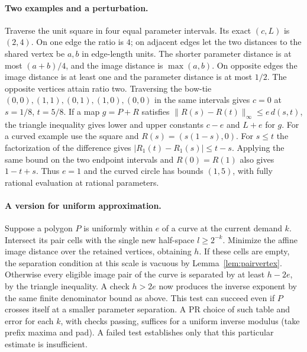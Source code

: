 \paragraph{Two examples and a perturbation.}
Traverse the unit square in four equal parameter intervals. Its exact $(c,L)$ is $(2,4)$. On one edge the ratio is $4$; on adjacent edges let the two distances to the shared vertex be $a,b$ in edge-length units. The shorter parameter distance is at most $(a+b)/4$, and the image distance is $\max(a,b)$. On opposite edges the image distance is at least one and the parameter distance is at most $1/2$. The opposite vertices attain ratio two. Traversing the bow-tie $(0,0),(1,1),(0,1),(1,0),(0,0)$ in the same intervals gives $c=0$ at $s=1/8$, $t=5/8$. If a map $g=P+R$ satisfies $\|R(s)-R(t)\|_\infty\le e\, d(s,t)$, the triangle inequality gives lower and upper constants $c-e$ and $L+e$ for $g$. For a curved example use the square and $R(s)=(s(1-s),0)$. For $s\le t$ the factorization of the difference gives $|R_1(t)-R_1(s)|\le t-s$. Applying the same bound on the two endpoint intervals and $R(0)=R(1)$ also gives $1-t+s$. Thus $e=1$ and the curved circle has bounds $(1,5)$, with fully rational evaluation at rational parameters.

\paragraph{A version for uniform approximation.}
Suppose a polygon $P$ is uniformly within $e$ of a curve at the current demand $k$. Intersect its pair cells with the single new half-space $l\ge 2^{-k}$. Minimize the affine image distance over the retained vertices, obtaining $h$. If these cells are empty, the separation condition at this scale is vacuous by Lemma~\ref{lem:pairvertex}. Otherwise every eligible image pair of the curve is separated by at least $h-2e$, by the triangle inequality. A check $h>2e$ now produces the inverse exponent by the same finite denominator bound as above. This test can succeed even if $P$ crosses itself at a smaller parameter separation. A PR choice of such table and error for each $k$, with checks passing, suffices for a uniform inverse modulus (take prefix maxima and pad). A failed test establishes only that this particular estimate is insufficient.

